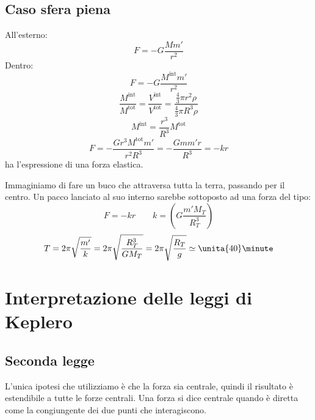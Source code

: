 \subsection{Caso sfera piena}

All'esterno:
\begin{equation*}F=-G\frac{Mm'}{r^2}\end{equation*}
Dentro:
\begin{equation*}F=-G\frac{M^{\text{int}}m'}{r^2}\end{equation*}
\begin{equation*}\frac{M^{\text{int}}}{M^{\text{tot}}}=\frac{V^{\text{int}}}{V^{\text{tot}}}=\frac{\frac{4}{3}\pi r^2\rho}{\frac{4}{3}\pi R^3\rho}\end{equation*}
\begin{equation*}M^{\text{int}}=\frac{r^3}{R^3}M^{\text{tot}}\end{equation*}
\begin{equation*}F=-\frac{Gr^3M^{\text{tot}}m'}{r^2R^3}=-\frac{Gmm'r}{R^3}=-kr\end{equation*}
ha l'espressione di una forza elastica.

\begin{Es}
Immaginiamo di fare un buco che attraversa tutta la terra, passando per il centro. Un pacco lanciato al suo interno sarebbe sottoposto ad una forza del tipo:
\begin{equation*}F=-kr\qquad k=\left(G\frac{m'M_T}{R_T^3}\right)\end{equation*}
\begin{equation*}T=2\pi\sqrt{\frac{m'}{k}}=2\pi\sqrt{\frac{R_T^3}{GM_T}}=2\pi\sqrt{\frac{R_T}{g}}\simeq \unita{40}\minute\end{equation*}
\end{Es}
\section{Interpretazione delle leggi di Keplero}
\subsection{Seconda legge}

L'unica ipotesi che utilizziamo è che la forza sia centrale,
quindi il risultato è estendibile a tutte le forze centrali. Una
forza si dice centrale quando è diretta come la congiungente dei
due punti che interagiscono.

